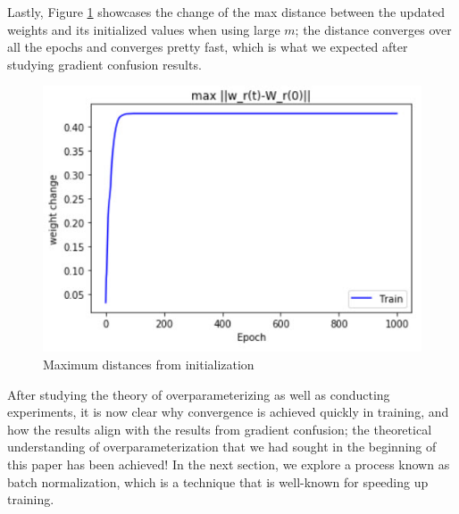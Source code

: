 \documentclass{article}
\begin{document}
Lastly, Figure \ref{fig:maxdistanceloss} showcases the change of the max distance between the updated weights and its initialized values when using large $m$; the distance converges over all the epochs and converges pretty fast, which is what we expected after studying gradient confusion results. 

\begin{figure}[htb]
	\centering
    \includegraphics[scale = 0.5]{pics/overparameterization/max_weight_change.jpg}
    \caption{Maximum distances from initialization}
	\label{fig:maxdistanceloss}
\end{figure}

After studying the theory of overparameterizing as well as conducting experiments, it is now clear why convergence is achieved quickly in training, and how the results align with the results from gradient confusion; the theoretical understanding of overparameterization that we had sought in the beginning of this paper has been achieved!  In the next section, we explore a process known as batch normalization, which is a technique that is well-known for speeding up training.

\pagebreak
\end{document}

